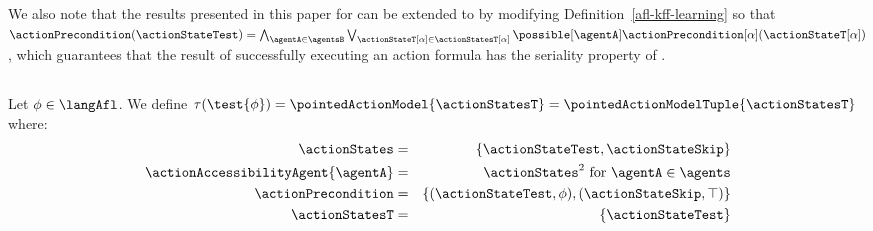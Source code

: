 \documentclass[twoside]{aiml14}
\begin{document}
  We also note that the results presented in this paper for \classKFF{} can be
  extended to \classKD{} by modifying Definition~\ref{afl-kff-learning} so that
  $\actionPrecondition(\actionStateTest) = \bigwedge_{\agentA \in \agentsB}
  \bigvee_{\actionStateT[\alpha] \in \actionStatesT[\alpha]} \possible[\agentA]
  \actionPrecondition[\alpha](\actionStateT[\alpha])$, which guarantees that
  the result of successfully executing an action formula has the seriality
  property of \classKD{}.

  \subsection{\classS{}}

  \begin{definition}[Test]\label{afl-s-test}
      Let $\phi \in \langAfl$. 
      We define $\tau(\test{\phi}) = \pointedActionModel{\actionStatesT} = \pointedActionModelTuple{\actionStatesT}$ where:
      \begin{eqnarray*}
          \actionStates &=& \{\actionStateTest, \actionStateSkip\}\\
          \actionAccessibilityAgent{\agentA} &=& \actionStates^2 \text{ for } \agentA \in \agents\\
          \actionPrecondition &=& \{(\actionStateTest, \phi), (\actionStateSkip, \top)\}\\
          \actionStatesT &=& \{\actionStateTest\}
      \end{eqnarray*}
  \end{definition}
\end{document}
